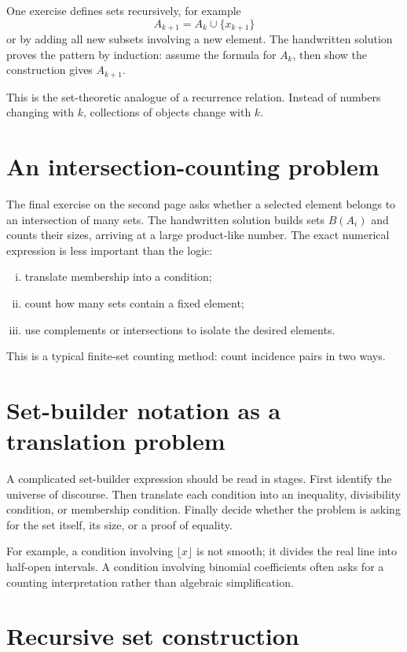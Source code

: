 One exercise defines sets recursively, for example
\[
  A_{k+1}=A_k\cup\{x_{k+1}\}
\]
or by adding all new subsets involving a new element.  The handwritten solution proves the pattern by induction: assume the formula for \(A_k\), then show the construction gives \(A_{k+1}\).

This is the set-theoretic analogue of a recurrence relation.  Instead of numbers changing with \(k\), collections of objects change with \(k\).

\section{An intersection-counting problem}

The final exercise on the second page asks whether a selected element belongs to an intersection of many sets.  The handwritten solution builds sets \(B(A_i)\) and counts their sizes, arriving at a large product-like number.  The exact numerical expression is less important than the logic:
\begin{enumerate}[(i)]
  \item translate membership into a condition;
  \item count how many sets contain a fixed element;
  \item use complements or intersections to isolate the desired elements.

\end{enumerate}
This is a typical finite-set counting method: count incidence pairs in two ways.


\section{Set-builder notation as a translation problem}

A complicated set-builder expression should be read in stages.  First identify the universe of discourse.  Then translate each condition into an inequality, divisibility condition, or membership condition.  Finally decide whether the problem is asking for the set itself, its size, or a proof of equality.

For example, a condition involving \(\lfloor x\rfloor\) is not smooth; it divides the real line into half-open intervals.  A condition involving binomial coefficients often asks for a counting interpretation rather than algebraic simplification.

\section{Recursive set construction}

